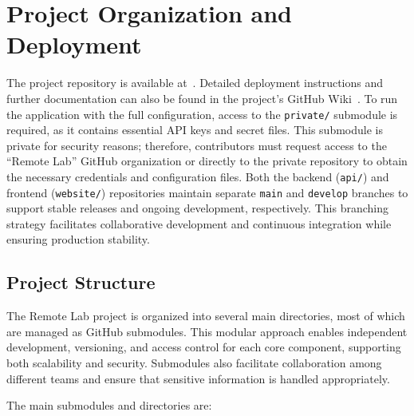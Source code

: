 \chapter{Project Organization and Deployment} \label{cap:project_org_deployment}
\let\cleardoublepage\clearpage

The project repository is available at~\cite{remote-lab-github}.
Detailed deployment instructions and further documentation can also be found in the project's GitHub Wiki~\cite{github-wiki}.
To run the application with the full configuration, access to the \texttt{private/} submodule is required, as it contains essential API keys and secret files. This submodule is private for security reasons; therefore, contributors must request access to the ``Remote Lab'' GitHub organization or directly to the private repository to obtain the necessary credentials and configuration files. Both the backend (\texttt{api/}) and frontend (\texttt{website/}) repositories maintain separate \texttt{main} and \texttt{develop} branches to support stable releases and ongoing development, respectively. This branching strategy facilitates collaborative development and continuous integration while ensuring production stability.

\section{Project Structure}

The Remote Lab project is organized into several main directories, most of which are managed as GitHub submodules. This modular approach enables independent development, versioning, and access control for each core component, supporting both scalability and security. Submodules also facilitate collaboration among different teams and ensure that sensitive information is handled appropriately.

The main submodules and directories are:

